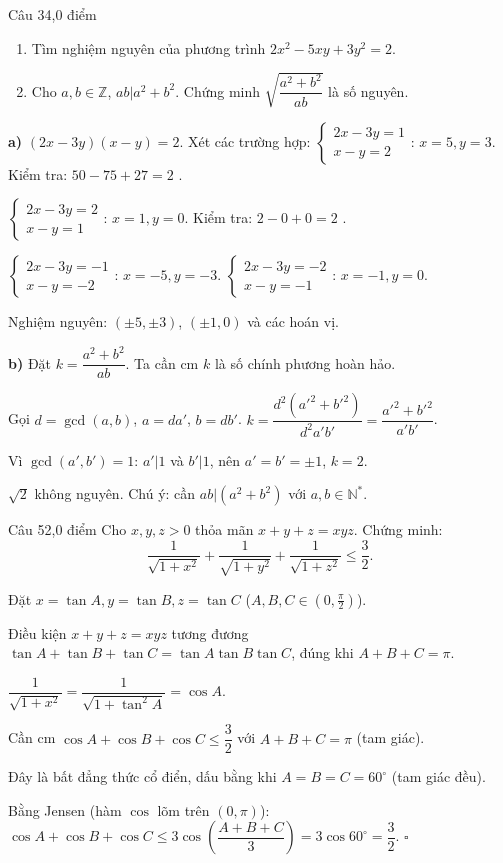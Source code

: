 \begin{de_cau}{Câu 3}{4,0 điểm}
\begin{enumerate}[label=\alph*)]
\item Tìm nghiệm nguyên của phương trình $2x^2-5xy+3y^2=2$.
\item Cho $a,b\in\mathbb{Z}$, $ab|a^2+b^2$. Chứng minh $\sqrt{\dfrac{a^2+b^2}{ab}}$ là số nguyên.
\end{enumerate}
\end{de_cau}

\begin{loi_giai_cau}
\textbf{a)} $(2x-3y)(x-y)=2$. Xét các trường hợp:
$\begin{cases}2x-3y=1\\x-y=2\end{cases}$: $x=5,y=3$. Kiểm tra: $50-75+27=2$ \checkmark .

$\begin{cases}2x-3y=2\\x-y=1\end{cases}$: $x=1, y=0$. Kiểm tra: $2-0+0=2$ \checkmark .

$\begin{cases}2x-3y=-1\\x-y=-2\end{cases}$: $x=-5,y=-3$.
$\begin{cases}2x-3y=-2\\x-y=-1\end{cases}$: $x=-1,y=0$.

Nghiệm nguyên: $(\pm 5,\pm 3)$, $(\pm 1, 0)$ và các hoán vị.

\textbf{b)} Đặt $k=\dfrac{a^2+b^2}{ab}$. Ta cần cm $k$ là số chính phương hoàn hảo.

Gọi $d=\gcd(a,b)$, $a=da'$, $b=db'$. $k=\dfrac{d^2(a'^2+b'^2)}{d^2a'b'}=\dfrac{a'^2+b'^2}{a'b'}$.

Vì $\gcd(a',b')=1$: $a'|1$ và $b'|1$, nên $a'=b'=\pm 1$, $k=2$.

$\sqrt{2}$ không nguyên. Chú ý: cần $ab|(a^2+b^2)$ với $a,b\in\mathbb{N}^*$.
\end{loi_giai_cau}

\begin{de_cau}{Câu 5}{2,0 điểm}
Cho $x,y,z>0$ thỏa mãn $x+y+z=xyz$. Chứng minh:
\[\frac{1}{\sqrt{1+x^2}}+\frac{1}{\sqrt{1+y^2}}+\frac{1}{\sqrt{1+z^2}}\leq\frac{3}{2}.\]
\end{de_cau}

\begin{loi_giai_cau}
Đặt $x=\tan A, y=\tan B, z=\tan C$ ($A,B,C\in(0,\frac{\pi}{2})$).

Điều kiện $x+y+z=xyz$ tương đương $\tan A+\tan B+\tan C=\tan A\tan B\tan C$, đúng khi $A+B+C=\pi$.

$\dfrac{1}{\sqrt{1+x^2}}=\dfrac{1}{\sqrt{1+\tan^2 A}}=\cos A$.

Cần cm $\cos A+\cos B+\cos C\leq\dfrac{3}{2}$ với $A+B+C=\pi$ (tam giác).

Đây là bất đẳng thức cổ điển, dấu bằng khi $A=B=C=60^\circ$ (tam giác đều).

Bằng Jensen (hàm $\cos$ lõm trên $(0,\pi)$):
$\cos A+\cos B+\cos C\leq 3\cos\left(\dfrac{A+B+C}{3}\right)=3\cos 60^\circ=\dfrac{3}{2}$. $\square$
\end{loi_giai_cau}
